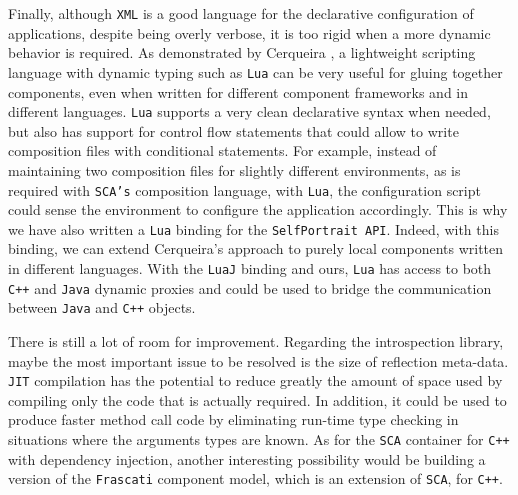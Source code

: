 Finally, although \texttt{XML} is a good language for the declarative configuration of applications, despite being overly verbose, it
is too rigid when a more dynamic behavior is required. As demonstrated by Cerqueira \cite{Cerqueira00}, a lightweight scripting language with
dynamic typing such as \texttt{Lua} \cite{Lua} can be very useful for gluing together components, even when written for different component
frameworks and in different languages. \texttt{Lua} supports a very clean declarative syntax when needed, but also has support for control
flow statements that could allow to write composition files with conditional statements. For example, instead of maintaining two
composition files for slightly different environments, as is required with \texttt{SCA's} composition language, with \texttt{Lua}, the configuration
script could sense the environment to configure the application accordingly. This is why we have also written a \texttt{Lua} binding
for the \texttt{SelfPortrait API}. Indeed, with this binding, we can extend Cerqueira's approach to purely local components written
in different languages. With the \texttt{LuaJ} binding and ours, \texttt{Lua} has access to both \texttt{C++} and \texttt{Java} dynamic proxies and could
be used to bridge the communication between \texttt{Java} and \texttt{C++} objects.

There is still a lot of room for improvement. Regarding the introspection library, maybe the most important issue to be resolved is the size of
reflection meta-data. \texttt{JIT} compilation has the potential to reduce greatly the amount of space used by compiling only the code that is
actually required. In addition, it could be used to produce faster method call code by eliminating run-time type checking
in situations where the arguments types are known. As for the \texttt{SCA} container for \texttt{C++} with dependency injection,
another interesting possibility would be building a version of the \texttt{Frascati} \cite{Seinturier} component model, which is an extension of
\texttt{SCA}, for \texttt{C++}.

